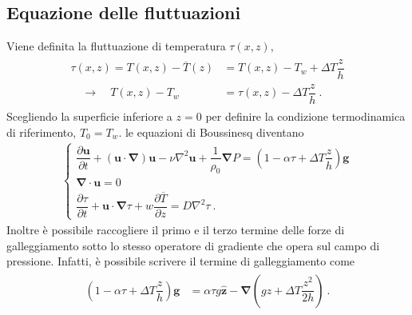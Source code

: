 \documentclass[letterpaper,10pt,italian]{jupyterBook}
\begin{document}
\subsection{Equazione delle fluttuazioni}
\label{\detokenize{polimi/fluidmechanics-ita/template/capitoli/07_similitudine/07teoria:equazione-delle-fluttuazioni}}
\sphinxAtStartPar
Viene definita la fluttuazione di temperatura \(\tau(x,z)\),
\begin{equation*}
\begin{split}\begin{aligned}
    \tau(x,z) = T(x,z) - \overline{T}(z) & = T(x,z) - T_w + \Delta T \dfrac{z}{h} \\
    \quad \rightarrow \quad T(x,z) - T_w & = \tau(x,z) - \Delta T \dfrac{z}{h} \ .
\end{aligned}\end{split}
\end{equation*}
\sphinxAtStartPar
Scegliendo la superficie inferiore a \(z = 0\) per
definire la condizione termodinamica di riferimento, \(T_0 = T_w\). le
equazioni di Boussinesq diventano
\begin{equation*}
\begin{split}\begin{cases}
      \dfrac{\partial \mathbf{u}}{\partial t} + 
      \left( \mathbf{u} \cdot \mathbf{\nabla} \right) \mathbf{u} -
      \nu \nabla^2 \mathbf{u} + \dfrac{1}{\rho_0}\mathbf{\nabla} P = \left( 1 - \alpha \tau + \Delta T \dfrac{z}{h} \right) \mathbf{g} \\
      \mathbf{\nabla} \cdot \mathbf{u} = 0 \\
      \dfrac{\partial \tau}{\partial t} + \mathbf{u} \cdot 
      \mathbf{\nabla} \tau + w \dfrac{\partial \overline{T}}{\partial z}=  D \nabla^2 \tau \ .
    \end{cases}\end{split}
\end{equation*}
\sphinxAtStartPar
Inoltre è possibile raccogliere il primo e il terzo
termine delle forze di galleggiamento sotto lo stesso operatore di
gradiente che opera sul campo di pressione. Infatti, è possibile
scrivere il termine di galleggiamento come
\begin{equation*}
\begin{split}\begin{aligned}
    \left( 1 - \alpha \tau + \Delta T \dfrac{z}{h} \right) \mathbf{g} & = \alpha \tau g \mathbf{\hat{z}} - \mathbf{\nabla} \left( gz + \Delta T \dfrac{z^2}{2 h} \right) \ .
\end{aligned}\end{split}
\end{equation*}
\end{document}
